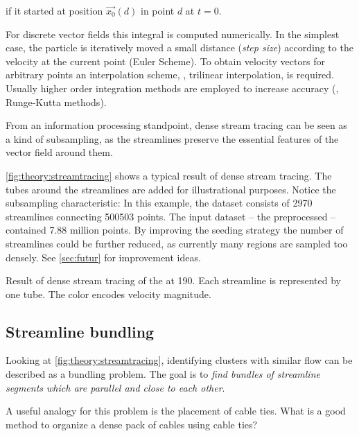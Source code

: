 if it started at position $\vec{x_0}(d)$ in point $d$ at $t=0$.

For discrete vector fields this integral is computed numerically. In the simplest case, the particle is iteratively moved a small distance (\emph{step size}) according to the velocity at the current point (Euler Scheme). To obtain velocity vectors for arbitrary points an interpolation scheme, \eg, trilinear interpolation, is required. Usually higher order integration methods are employed to increase accuracy (\eg, Runge-Kutta methods).

From an information processing standpoint, dense stream tracing can be seen as a kind of subsampling, as the streamlines preserve the essential features of the vector field around them.

\autoref{fig:theory:streamtracing} shows a typical result of dense stream tracing. The tubes around the streamlines are added for illustrational purposes. Notice the subsampling characteristic: In this example, the dataset consists of \num{2970} streamlines connecting \num{500503} points. The input dataset -- the preprocessed \toyotadataset -- contained \num{7.88} million points.
By improving the seeding strategy the number of streamlines could be further reduced, as currently many regions are sampled too densely. See \autoref{sec:futur} for improvement ideas.

{Result of dense stream tracing of the \toyotadataset at \SI{190}{\kmh}. Each streamline is represented by one tube. The color encodes velocity magnitude.}


\subsection{Streamline bundling}
\label{sec:theory:streamline-bundling}

Looking at \autoref{fig:theory:streamtracing}, identifying clusters with similar flow can be described as a bundling problem. The goal is to \emph{find bundles of streamline segments which are parallel and close to each other}.

A useful analogy for this problem is the placement of cable ties. What is a good method to organize a dense pack of cables using cable ties?


